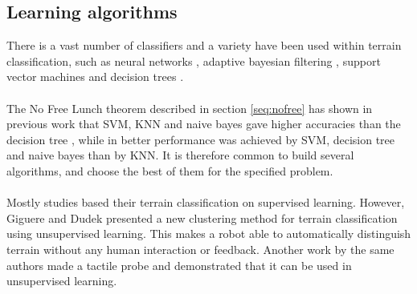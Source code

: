 \documentclass[USenglish]{ifimaster}  %
\begin{document}
\subsection{Learning algorithms}
There is a vast number of classifiers and a variety have been used within terrain classification, such as neural networks \cite{6784609,5752869,4654717}, adaptive bayesian filtering  \cite{5152327,6849778}, support vector machines \cite{5602459,4161556,4059113} and decision trees  \cite{6849778}.
\\
\\
The No Free Lunch theorem described in section \ref{seq:nofree} has shown in previous work that SVM, KNN and naive bayes gave higher accuracies than the decision tree \cite{DBLP:conf/emcr/WeissFSZ07}, while in \cite{6849778} better performance was achieved by SVM, decision tree and naive bayes than by KNN. It is therefore common to build several algorithms, and choose the best of them for the specified problem. 
\\
\\
Mostly studies based their terrain classification on supervised learning. However, Giguere and Dudek \cite{Giguere2009} presented a new clustering method for terrain classification using unsupervised learning. This makes a robot able to automatically distinguish terrain without any human interaction or feedback. Another work by the same authors  \cite{5752869} made a tactile probe and demonstrated that it can be used in unsupervised learning.
	
\end{document}
